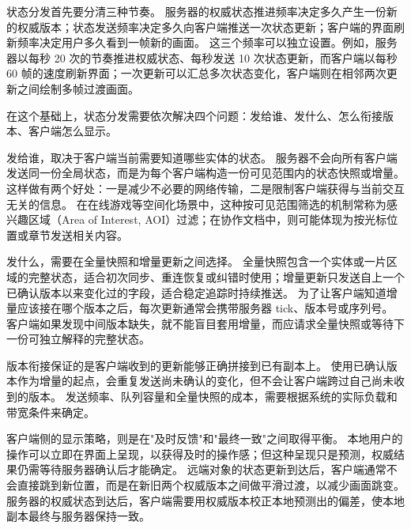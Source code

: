 状态分发首先要分清三种节奏。
服务器的权威状态推进频率决定多久产生一份新的权威版本；状态发送频率决定多久向客户端推送一次状态更新；客户端的界面刷新频率决定用户多久看到一帧新的画面。
这三个频率可以独立设置。例如，服务器以每秒 20 次的节奏推进权威状态、每秒发送 10 次状态更新，而客户端以每秒 60 帧的速度刷新界面；一次更新可以汇总多次状态变化，客户端则在相邻两次更新之间绘制多帧过渡画面。

在这个基础上，状态分发需要依次解决四个问题：发给谁、发什么、怎么衔接版本、客户端怎么显示。

发给谁，取决于客户端当前需要知道哪些实体的状态。
服务器不会向所有客户端发送同一份全局状态，而是为每个客户端构造一份可见范围内的状态快照或增量。
这样做有两个好处：一是减少不必要的网络传输，二是限制客户端获得与当前交互无关的信息。
在在线游戏等空间化场景中，这种按可见范围筛选的机制常称为感兴趣区域（Area of Interest, AOI）过滤；在协作文档中，则可能体现为按光标位置或章节发送相关内容。

发什么，需要在全量快照和增量更新之间选择。
全量快照包含一个实体或一片区域的完整状态，适合初次同步、重连恢复或纠错时使用；增量更新只发送自上一个已确认版本以来变化过的字段，适合稳定追踪时持续推送。
为了让客户端知道增量应该接在哪个版本之后，每次更新通常会携带服务器 tick、版本号或序列号。
客户端如果发现中间版本缺失，就不能盲目套用增量，而应请求全量快照或等待下一份可独立解释的完整状态。

版本衔接保证的是客户端收到的更新能够正确拼接到已有副本上。
使用已确认版本作为增量的起点，会重复发送尚未确认的变化，但不会让客户端跨过自己尚未收到的版本。
发送频率、队列容量和全量快照的成本，需要根据系统的实际负载和带宽条件来确定。

客户端侧的显示策略，则是在"及时反馈"和"最终一致"之间取得平衡。
本地用户的操作可以立即在界面上呈现，以获得及时的操作感；但这种呈现只是预测，权威结果仍需等待服务器确认后才能确定。
远端对象的状态更新到达后，客户端通常不会直接跳到新位置，而是在新旧两个权威版本之间做平滑过渡，以减少画面跳变。
服务器的权威状态到达后，客户端需要用权威版本校正本地预测出的偏差，使本地副本最终与服务器保持一致。

